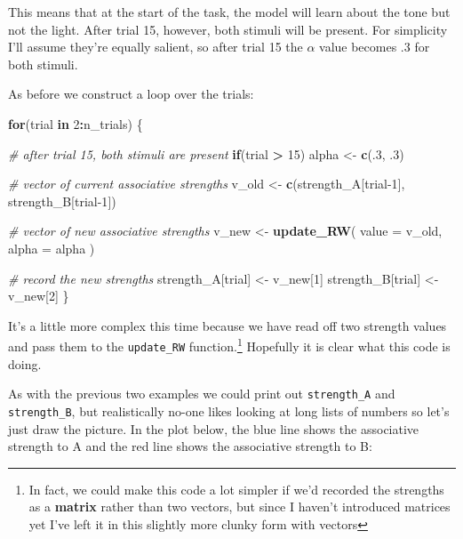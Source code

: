 \documentclass[]{book}
\newenvironment{Shaded}{\begin{snugshade}}{\end{snugshade}}
\newcommand{\CommentTok}[1]{\textcolor[rgb]{0.56,0.35,0.01}{\textit{#1}}}
\newcommand{\ControlFlowTok}[1]{\textcolor[rgb]{0.13,0.29,0.53}{\textbf{#1}}}
\newcommand{\DataTypeTok}[1]{\textcolor[rgb]{0.13,0.29,0.53}{#1}}
\newcommand{\DecValTok}[1]{\textcolor[rgb]{0.00,0.00,0.81}{#1}}
\newcommand{\FloatTok}[1]{\textcolor[rgb]{0.00,0.00,0.81}{#1}}
\newcommand{\KeywordTok}[1]{\textcolor[rgb]{0.13,0.29,0.53}{\textbf{#1}}}
\newcommand{\NormalTok}[1]{#1}
\newcommand{\OperatorTok}[1]{\textcolor[rgb]{0.81,0.36,0.00}{\textbf{#1}}}
\newcommand{\StringTok}[1]{\textcolor[rgb]{0.31,0.60,0.02}{#1}}
\let\rmarkdownfootnote\footnote%
\def\footnote{\protect\rmarkdownfootnote}
\begin{document}
This means that at the start of the task, the model will learn about the tone but not the light. After trial 15, however, both stimuli will be present. For simplicity I'll assume they're equally salient, so after trial 15 the \(\alpha\) value becomes .3 for both stimuli.

As before we construct a loop over the trials:

\begin{Shaded}
\begin{Highlighting}[]
\ControlFlowTok{for}\NormalTok{(trial }\ControlFlowTok{in} \DecValTok{2}\OperatorTok{:}\NormalTok{n_trials) \{}
  
  \CommentTok{# after trial 15, both stimuli are present}
  \ControlFlowTok{if}\NormalTok{(trial }\OperatorTok{>}\StringTok{ }\DecValTok{15}\NormalTok{) alpha <-}\StringTok{ }\KeywordTok{c}\NormalTok{(.}\DecValTok{3}\NormalTok{, }\FloatTok{.3}\NormalTok{)}
  
  \CommentTok{# vector of current associative strengths}
\NormalTok{  v_old <-}\StringTok{ }\KeywordTok{c}\NormalTok{(strength_A[trial}\DecValTok{-1}\NormalTok{], strength_B[trial}\DecValTok{-1}\NormalTok{])}
  
  \CommentTok{# vector of new associative strengths}
\NormalTok{  v_new <-}\StringTok{ }\KeywordTok{update_RW}\NormalTok{(}
    \DataTypeTok{value =}\NormalTok{ v_old,}
    \DataTypeTok{alpha =}\NormalTok{ alpha}
\NormalTok{   )}
  
  \CommentTok{# record the new strengths}
\NormalTok{  strength_A[trial] <-}\StringTok{ }\NormalTok{v_new[}\DecValTok{1}\NormalTok{]}
\NormalTok{  strength_B[trial] <-}\StringTok{ }\NormalTok{v_new[}\DecValTok{2}\NormalTok{]}
\NormalTok{\}}
\end{Highlighting}
\end{Shaded}

It's a little more complex this time because we have read off two strength values and pass them to the \texttt{update\_RW} function.\footnote{In fact, we could make this code a lot simpler if we'd recorded the strengths as a \textbf{matrix} rather than two vectors, but since I haven't introduced matrices yet I've left it in this slightly more clunky form with vectors} Hopefully it is clear what this code is doing.

As with the previous two examples we could print out \texttt{strength\_A} and \texttt{strength\_B}, but realistically no-one likes looking at long lists of numbers so let's just draw the picture. In the plot below, the blue line shows the associative strength to A and the red line shows the associative strength to B:
\end{document}
